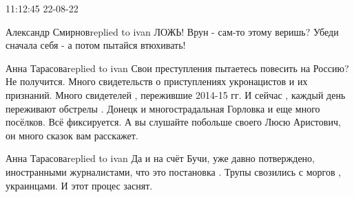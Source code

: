  
 
 
 
 

11:12:45 22-08-22

Александр Смирновreplied to ivan
ЛОЖЬ! Врун - сам-то этому веришь? Убеди сначала себя - а потом пытайся втюхивать!

Анна Тарасоваreplied to ivan
Свои преступления пытаетесь повесить на Россию? Не получится. Много свидетельств о приступлениях укронацистов и их признаний. Много свидетелей , пережившие 2014-15 гг. И сейчас , каждый день переживают обстрелы . Донецк и многострадальная Горловка и еще много посёлков. Всё фиксируется.
А вы слушайте побольше своего Люсю Аристович, он много сказок вам расскажет.

Анна Тарасоваreplied to ivan
Да и на счёт Бучи, уже давно потверждено, иностранными журналистами, что это постановка . Трупы свозились с моргов , украинцами. И этот процес заснят.
